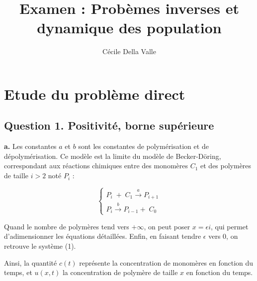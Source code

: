 \documentclass[a4paper]{article}
\title{Examen : Probèmes inverses et dynamique des population}
\author{Cécile Della Valle}
\begin{document}
\maketitle

\section{Etude du problème direct}

\subsection*{Question 1. Positivité, borne supérieure}


 \textbf{a.} Les constantes $a$ et $b$ sont les constantes de polymérisation et de dépolymérisation. 
 Ce modèle est la limite du modèle de Becker-Döring, 
 correspondant aux réactions chimiques entre des monomères $C_1$ 
 et des polymères de taille $i>2$ noté $P_i$ :
 
\begin{equation}
    \begin{cases}
	P_{i} \; + \; C_1 \overset{a}{\longrightarrow} P_{i+1}\\
	P_{i} \overset{b}{\longrightarrow}  P_{i-1} + \;C_0
    \end{cases}
\end{equation}

Quand le nombre de polymères tend vers $+\infty$, 
on peut poser $x=\epsilon i$, 
qui permet d'adimensionner les équations détaillées. 
Enfin, en faisant tendre $\epsilon$ vers $0$,
on retrouve le système (1).

Ainsi, la quantité $c(t)$ représente 
la concentration de monomères en fonction du temps, et $u(x,t)$ la concentration de polymère de taille $x$ en fonction du temps.
\end{document}
